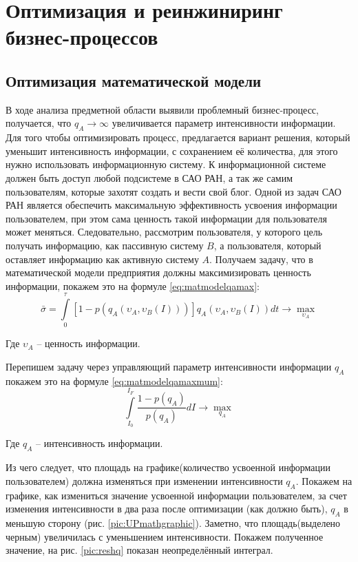 \section{Оптимизация и реинжиниринг бизнес-процессов}
\subsection{Оптимизация математической модели}
В ходе анализа предметной области выявили проблемный бизнес-процесс, получается, что $q_A \rightarrow \infty$ увеличивается параметр интенсивности информации. Для того чтобы оптимизировать процесс, предлагается вариант решения, который уменьшит интенсивность информации, с сохранением её количества, для этого нужно использовать информационную систему. К информационной системе должен быть доступ любой подсистеме в САО РАН, а так же самим пользователям, которые захотят создать и вести свой блог.
Одной из задач САО РАН является обеспечить максимальную эффективность усвоения информации пользователем, при этом сама ценность такой информации для пользователя может меняться. Следовательно, рассмотрим пользователя, у которого цель получать информацию, как пассивную систему $B$, а пользователя, который оставляет информацию как активную систему $A$. Получаем задачу, что в математической модели предприятия должны максимизировать ценность информации, покажем это на формуле \ref{eq:matmodelqamax}: 
\begin{equation}\label{eq:matmodelqamax}
\bar \sigma  = \int\limits_0^\tau  {\left[ {1 - p\left( {q_A \left( {\upsilon _A ,\upsilon _B \left( I \right)} \right)} \right)} \right]} q_A \left( {\upsilon _A ,\upsilon _B \left( I \right)} \right)dt \to \mathop {\max }\limits_{\upsilon _A } 
\end{equation}

Где $\upsilon _A$ -- ценность информации. 

Перепишем задачу через управляющий параметр интенсивности информации $q_A$ покажем это на формуле \ref{eq:matmodelqamaxmum}: 
\begin{equation}\label{eq:matmodelqamaxmum}
\int\limits_{I_0 }^{I_F } {\frac{{1 - p(q_A )}}{{p(q_A )}}} dI \to \mathop {\max }\limits_{q_A } 
\end{equation} 

Где $q_A$ -- интенсивность информации.

Из чего следует, что площадь на графике(количество усвоенной информации пользователем) должна изменяться при изменении интенсивности $q_A$. Покажем на графике, как измениться значение усвоенной информации пользователем, за счет изменения интенсивности в два раза после оптимизации (как должно быть),  $q_A$ в меньшую сторону (рис. \ref{pic:UPmathgraphic}). 
Заметно, что площадь(выделено черным) увеличилась с уменьшением интенсивности. Покажем полученное значение, на рис. \ref{pic:reshq} показан неопределённый интеграл.

